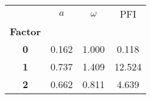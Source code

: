 \begin{tabular}{cccc}
\toprule
{} &   $a$ &  $\omega$ &    PFI \\
\textbf{Factor} &       &           &        \\
\midrule
\textbf{0     } & 0.162 &     1.000 &  0.118 \\
\textbf{1     } & 0.737 &     1.409 & 12.524 \\
\textbf{2     } & 0.662 &     0.811 &  4.639 \\
\bottomrule
\end{tabular}

